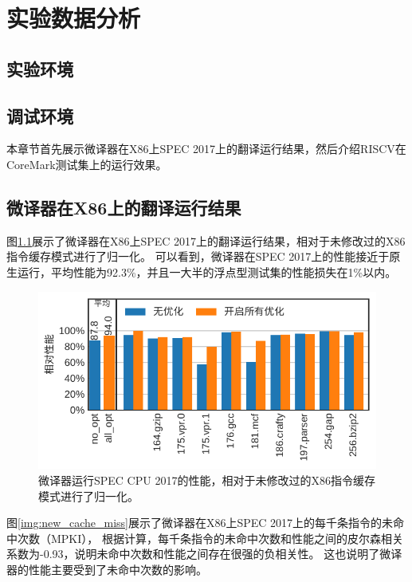 \chapter{实验数据分析}\label{chap:Epxeriment}

\section{实验环境}


\section{调试环境}

本章节首先展示微译器在X86上SPEC 2017上的翻译运行结果，然后介绍RISCV在CoreMark测试集上的运行效果。

\section{微译器在X86上的翻译运行结果}

图\ref{img:ucache_ipc}展示了微译器在X86上SPEC 2017上的翻译运行结果，相对于未修改过的X86指令缓存模式进行了归一化。
可以看到，微译器在SPEC 2017上的性能接近于原生运行，平均性能为92.3\%，并且一大半的浮点型测试集的性能损失在1\%以内。

\begin{figure}[h]
  \centering
  \includegraphics[width=1\linewidth]{./plot/ucache_ipc.pdf}
  \caption{微译器运行SPEC CPU 2017的性能，相对于未修改过的X86指令缓存模式进行了归一化。}
  \label{img:ucache_ipc}
\end{figure}

图\ref{img:new_cache_miss}展示了微译器在X86上SPEC 2017上的每千条指令的未命中次数（MPKI），
根据计算，每千条指令的未命中次数和性能之间的皮尔森相关系数为-0.93，说明未命中次数和性能之间存在很强的负相关性。
这也说明了微译器的性能主要受到了未命中次数的影响。

